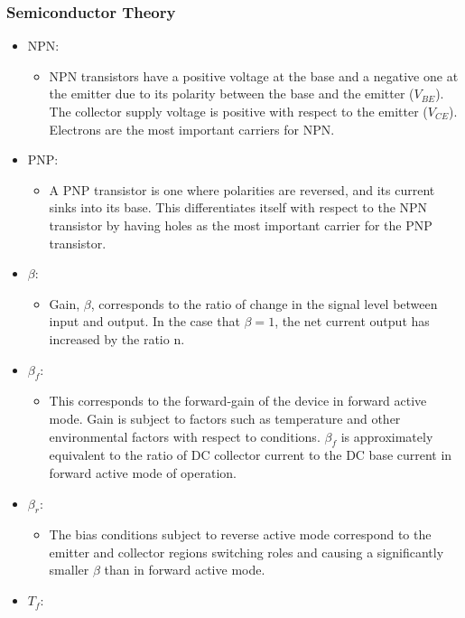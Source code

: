 \documentclass[12pt]{article}
\begin{document}
\subsubsection{Semiconductor Theory}
\begin{itemize}
\item NPN:
\begin{itemize}
\item NPN transistors have a positive voltage at the base and a negative one at the emitter due to its polarity between the base and the emitter ($V_{BE}$). The collector supply voltage is positive with respect to the emitter ($V_{CE}$). Electrons are the most important carriers for NPN.
\end{itemize}
\item PNP:
\begin{itemize}
\item A PNP transistor is one where polarities are reversed, and its current sinks into its base. This differentiates itself with respect to the NPN transistor by having holes as the most important carrier for the PNP transistor.
\end{itemize}
\item $\beta$:
\begin{itemize}
\item Gain, $\beta$, corresponds to the ratio of change in the signal level between input and output. In the case that $\beta=1$, the net current output has increased by the ratio n.
\end{itemize} 
\item $\beta_f$:
\begin{itemize}
\item This corresponds to the forward-gain of the device in forward active mode. Gain is subject to factors such as temperature and other environmental factors with respect to conditions. $\beta_f$ is approximately equivalent to the ratio of DC collector current to the DC base current in forward active mode of operation. 
\end{itemize}
\item $\beta_r$:
\begin{itemize}
\item The bias conditions subject to reverse active mode correspond to the emitter and collector regions switching roles and causing a significantly smaller $\beta$ than in forward active mode.
\end{itemize}
\item $T_f$:
\begin{itemize}

\end{itemize}
\end{itemize}
\end{document}
